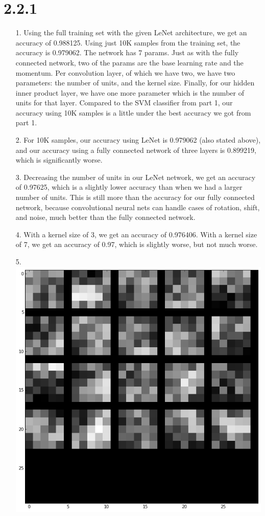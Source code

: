 \documentclass[11pt]{article}
\begin{document}
\section*{2.2.1}
\begin{itemize}
\item[1.] Using the full training set with the given LeNet architecture, we get an accuracy of 0.988125. Using just 10K samples from the training set, the accuracy is 0.979062. The network has 7 params. Just as with the fully connected network, two of the params are the base learning rate and the momentum. Per convolution layer, of which we have two, we have two parameters: the number of units, and the kernel size. Finally, for our hidden inner product layer, we have one more parameter which is the number of units for that layer.
 Compared to the SVM classifier from part 1, our accuracy using 10K samples is a little under the best accuracy we got from part 1.
\item[2.] For 10K samples, our accuracy using LeNet is 0.979062 (also stated above), and our accuracy using a fully connected network of three layers is 0.899219, which is significantly worse.
\item[3.] Decreasing the number of units in our LeNet network, we get an accuracy of 0.97625, which is a slightly lower accuracy than when we had a larger number of units. This is still more than the accuracy for our fully connected network, because convolutional neural nets can handle cases of rotation, shift, and noise, much better than the fully connected network.
\item[4.] With a kernel size of 3, we get an accuracy of 0.976406. With a kernel size of 7, we get an accuracy of 0.97, which is slightly worse, but not much worse. 
\item[5.] \includegraphics[scale=0.3]{diagrams/filter.png}\\

\end{itemize}
\end{document}
